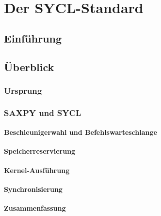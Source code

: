 \chapter{Der SYCL-Standard}\label{sycl}

\section{Einführung}\label{sycl:intro}

\section{Überblick}\label{sycl:ueberblick}

\subsection{Ursprung}\label{sycl:ueberblick:ursprung}

\subsection{SAXPY und SYCL}\label{sycl:ueberblick:saxpy}

\subsubsection{Beschleunigerwahl und Befehlswarteschlange}
\label{sycl:ueberblick:saxpy:queue}

\subsubsection{Speicherreservierung}
\label{sycl:ueberblick:saxpy:buffer}

\subsubsection{Kernel-Ausführung}
\label{sycl:ueberblick:saxpy:kernel}

\subsubsection{Synchronisierung}
\label{sycl:ueberblick:saxpy:sync}

\subsubsection{Zusammenfassung}
\label{sycl:ueberblick:saxpy:zusammenfassung}


